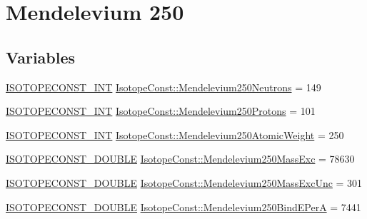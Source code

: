 \hypertarget{group___isotope_const-_mendelevium-_md250}{}\section{Mendelevium 250}
\label{group___isotope_const-_mendelevium-_md250}
\subsection*{Variables}
\begin{DoxyCompactItemize}
\item 
\mbox{\hyperlink{group___isotope_const-_macros_ga5f18360b3e99483a35c32d789e62621c}{I\+S\+O\+T\+O\+P\+E\+C\+O\+N\+S\+T\+\_\+\+I\+NT}} \mbox{\hyperlink{group___isotope_const-_mendelevium-_md250_ga51c942a234d8cadc66eff696796d6622}{Isotope\+Const\+::\+Mendelevium250\+Neutrons}} = 149
\item 
\mbox{\hyperlink{group___isotope_const-_macros_ga5f18360b3e99483a35c32d789e62621c}{I\+S\+O\+T\+O\+P\+E\+C\+O\+N\+S\+T\+\_\+\+I\+NT}} \mbox{\hyperlink{group___isotope_const-_mendelevium-_md250_gaa8e9b75e901e23bd57033901185b0d9d}{Isotope\+Const\+::\+Mendelevium250\+Protons}} = 101
\item 
\mbox{\hyperlink{group___isotope_const-_macros_ga5f18360b3e99483a35c32d789e62621c}{I\+S\+O\+T\+O\+P\+E\+C\+O\+N\+S\+T\+\_\+\+I\+NT}} \mbox{\hyperlink{group___isotope_const-_mendelevium-_md250_gad0cbd0f39a971da059d7477ff8bd304c}{Isotope\+Const\+::\+Mendelevium250\+Atomic\+Weight}} = 250
\item 
\mbox{\hyperlink{group___isotope_const-_macros_ga8f45a7272ce02c0b4c65c44636ed719a}{I\+S\+O\+T\+O\+P\+E\+C\+O\+N\+S\+T\+\_\+\+D\+O\+U\+B\+LE}} \mbox{\hyperlink{group___isotope_const-_mendelevium-_md250_ga9c915059a7350576f6e5ba46eca008f7}{Isotope\+Const\+::\+Mendelevium250\+Mass\+Exc}} = 78630
\item 
\mbox{\hyperlink{group___isotope_const-_macros_ga8f45a7272ce02c0b4c65c44636ed719a}{I\+S\+O\+T\+O\+P\+E\+C\+O\+N\+S\+T\+\_\+\+D\+O\+U\+B\+LE}} \mbox{\hyperlink{group___isotope_const-_mendelevium-_md250_ga4d93f9f13376c27a49fc4b03a50116d7}{Isotope\+Const\+::\+Mendelevium250\+Mass\+Exc\+Unc}} = 301
\item 
\mbox{\hyperlink{group___isotope_const-_macros_ga8f45a7272ce02c0b4c65c44636ed719a}{I\+S\+O\+T\+O\+P\+E\+C\+O\+N\+S\+T\+\_\+\+D\+O\+U\+B\+LE}} \mbox{\hyperlink{group___isotope_const-_mendelevium-_md250_ga13113c12cda17002989d2beb8eaf7b9d}{Isotope\+Const\+::\+Mendelevium250\+Bind\+E\+PerA}} = 7441

\end{DoxyCompactItemize}
